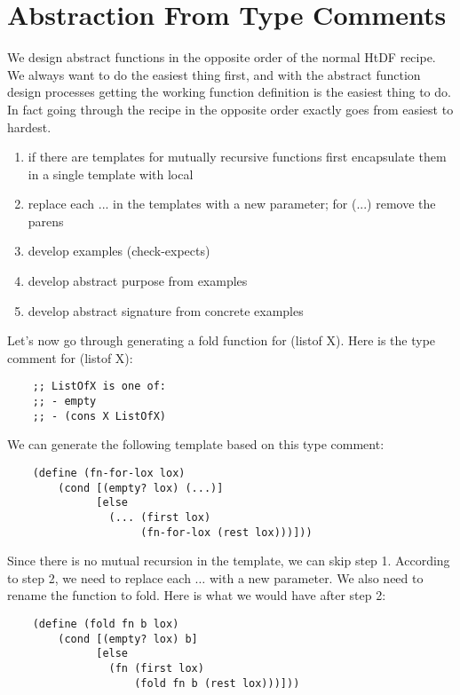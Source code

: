 \documentclass[11pt,a4paper]{report}
\begin{document}
	\section{Abstraction From Type Comments} \label{sec:abs_from_type_comm}
	We design abstract functions in the opposite order of the normal HtDF recipe. We always want to
	do the easiest thing first, and with the abstract function design processes getting the working
	function definition is the easiest thing to do. In fact going through the recipe in the opposite order
	exactly goes from easiest to hardest.
	\begin{enumerate}
		\item if there are templates for mutually recursive functions first encapsulate them in a single
		template with local
		\item replace each ... in the templates with a new parameter; for (...) remove the parens
		\item develop examples (check-expects)
		\item develop abstract purpose from examples
		\item develop abstract signature from concrete examples
	\end{enumerate}

	Let's now go through generating a fold function for (listof X). Here is the type comment for
	(listof X):
	
	\begin{verbatim}
	;; ListOfX is one of:
	;; - empty
	;; - (cons X ListOfX)
	\end{verbatim}
	
	We can generate the following template based on this type comment:
	
	\begin{verbatim}
	(define (fn-for-lox lox)
		(cond [(empty? lox) (...)]
		      [else
		        (... (first lox)
		             (fn-for-lox (rest lox)))]))
	\end{verbatim}
	
	Since there is no mutual recursion in the template, we can skip step 1. According to step 2, we
	need to replace each $\ldots$ with a new parameter. We also need to rename the function to fold.
	Here is what we would have after step 2:
	
	\begin{verbatim}
	(define (fold fn b lox)
		(cond [(empty? lox) b]
		      [else
		        (fn (first lox)
		            (fold fn b (rest lox)))]))
	\end{verbatim}
	
\end{document}
